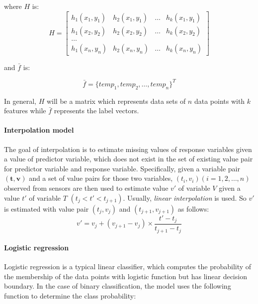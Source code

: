 where $H$ is:
\begin{equation}
    H=\begin{bmatrix}
h_1(x_1,y_1) & h_2(x_1,y_1) &\dots &h_k(x_1,y_1)\\
h_1(x_2,y_2) & h_2(x_2,y_2) &\dots &h_k(x_2,y_2)\\
\dots\\
h_1(x_n,y_n) & h_2(x_n,y_n) &\dots &h_k(x_n,y_n)
\end{bmatrix}
\end{equation}

and $\bar{f}$ is:

\begin{equation}
    \bar{f} = \{temp_1, temp_2,\dots, temp_n\}^T
\end{equation}

In general, $H$ will be a matrix which represents data sets of $n$ data points with $k$ features while $\bar{f}$ represents the label vectors.

\paragraph{Interpolation model} 

The goal of interpolation is to estimate missing values of response variables given a value of predictor variable, which does not exist in the set of existing value pair for predictor variable and response variable. Specifically, given a variable pair $(\textbf{t},\textbf{v})$ and a set of value pairs for those two variables, $(t_i, v_i)(i=1,2,\dots,n)$ observed from sensors are then used to estimate value $v'$ of variable $V$ given a value $t'$ of variable $T$ $(t_j< t' < t_{j+1})$. Usually, {\em linear interpolation} is used. So $v'$ is estimated with value pair $(t_j, v_j)$ and $(t_{j+1}, v_{j+1})$ as follows:
\begin{equation}\label{eq: interpolation}
    v'= v_j + (v_{j+1}-v_j)\times\frac{t'-t_j}{t_{j+1}-t_j}
\end{equation}



\paragraph{Logistic regression}
Logistic regression is a typical linear classifier, which computes the probability of the membership of the data points with logistic function but has linear decision boundary. In the case of binary classification, the model uses the following function to determine the class probability:

